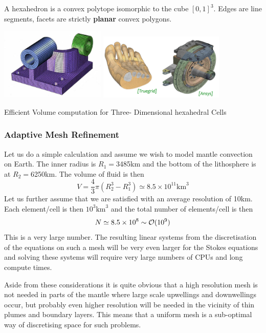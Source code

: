 A hexahedron is a convex polytope isomorphic to the cube $[0,1]^3$.
Edges are line segments, facets are strictly {\bf planar} convex polygons.

\begin{center}
\includegraphics[width=5cm]{images/meshes/hexa.jpg}
\includegraphics[width=6cm]{images/meshes/hexa2}
\end{center}

\Literature Efficient Volume computation for Three- Dimensional hexahedral Cells \cite{duko88,gran97}

\subsubsection{Adaptive Mesh Refinement}
 

Let us do a simple calculation and assume we wish to model mantle convection on Earth. 
The inner radius is $R_1=$3485km and the bottom of the lithosphere is at $R_2=$6250km. 
The volume of fluid is then 
\[
V = \frac{4}{3}\pi (R_2^3-R_1^3) \simeq 8.5\times 10^{11} \text{km}^3
\]
Let us further assume that we are satisfied with an average resolution of 10km. 
Each element/cell is then $10^3\text{km}^3$ and the total number of elements/cell is then 
\[
N \simeq 8.5 \times 10^8 \sim {\cal O}(10^9)
\]
This is a very large number. The resulting linear systems from the discretisation of the 
equations on such a mesh will be very even larger for the Stokes equations and solving 
these systems will require very large numbers of CPUs and long compute times. 

Aside from these considerations it is quite obvious that a high resolution mesh is not needed 
in parts of the mantle where large scale upwellings and downwellings occur, but 
probably even higher resolution will be needed in the vicinity of thin plumes and boundary layers. 
This means that a uniform mesh is a sub-optimal way of discretising space for such problems. 

